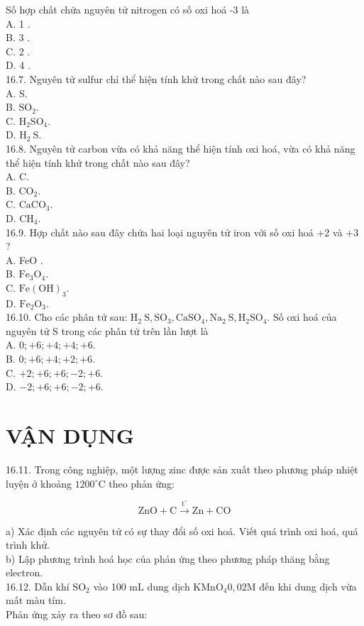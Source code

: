 \documentclass[10pt]{article}
\begin{document}
Số hợp chất chứa nguyên tử nitrogen có số oxi hoá -3 là\\
A. 1 .\\
B. 3 .\\
C. 2 .\\
D. 4 .\\
16.7. Nguyên tử sulfur chỉ thể hiện tính khử trong chất nào sau đây?\\
A. S.\\
B. $\mathrm{SO}_{2}$.\\
C. $\mathrm{H}_{2} \mathrm{SO}_{4}$.\\
D. $\mathrm{H}_{2} \mathrm{~S}$.\\
16.8. Nguyên tử carbon vừa có khả năng thể hiện tính oxi hoá, vừa có khả năng thể hiện tính khử trong chất nào sau đây?\\
A. C.\\
B. $\mathrm{CO}_{2}$.\\
C. $\mathrm{CaCO}_{3}$.\\
D. $\mathrm{CH}_{4}$.\\
16.9. Hợp chất nào sau đây chứa hai loại nguyên tử iron với số oxi hoá +2 và +3 ?\\
A. FeO .\\
B. $\mathrm{Fe}_{3} \mathrm{O}_{4}$.\\
C. $\mathrm{Fe}(\mathrm{OH})_{3}$.\\
D. $\mathrm{Fe}_{2} \mathrm{O}_{3}$.\\
16.10. Cho các phân tử sau: $\mathrm{H}_{2} \mathrm{~S}, \mathrm{SO}_{3}, \mathrm{CaSO}_{4}, \mathrm{Na}_{2} \mathrm{~S}, \mathrm{H}_{2} \mathrm{SO}_{4}$. Số oxi hoá của nguyên tử S trong các phân tứ trên lần lượt là\\
A. $0 ;+6 ;+4 ;+4 ;+6$.\\
B. $0 ;+6 ;+4 ;+2 ;+6$.\\
C. $+2 ;+6 ;+6 ;-2 ;+6$.\\
D. $-2 ;+6 ;+6 ;-2 ;+6$.

\section*{VẬN DỤNG}
16.11. Trong công nghiệp, một lượng zinc được sản xuất theo phương pháp nhiệt luyện ở khoảng $1200^{\circ} \mathrm{C}$ theo phản ứng:

$$
\mathrm{ZnO}+\mathrm{C} \xrightarrow{\mathrm{t}^{\circ}} \mathrm{Zn}+\mathrm{CO}
$$

a) Xác định các nguyên tử có sự thay đổi số oxi hoá. Viết quá trình oxi hoá, quá trình khử.\\
b) Lập phương trình hoá học của phản ứng theo phương pháp thăng bằng electron.\\
16.12. Dẫn khí $\mathrm{SO}_{2}$ vào 100 mL dung dịch $\mathrm{KMnO}_{4} 0,02 \mathrm{M}$ đến khi dung dịch vừa mất màu tím.\\
Phản ứng xảy ra theo sơ đồ sau:
\end{document}

